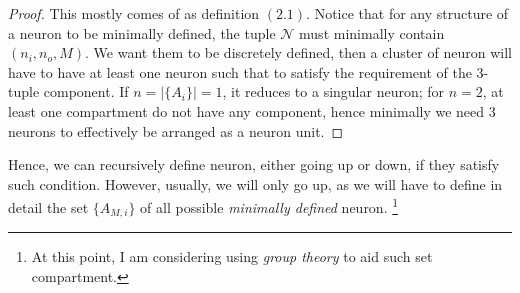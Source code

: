 \begin{proof}
    This mostly comes of as definition $(2.1)$. Notice that for any structure of a neuron to be minimally defined, the tuple $\mathcal{N}$ must minimally contain $(n_{i},n_{o},M)$. We want them to be discretely defined, then a cluster of neuron will have to have at least one neuron such that to satisfy the requirement of the 3-tuple component. If $n=\lvert \{ A_{i} \} \rvert=1$, it reduces to a singular neuron; for $n=2$, at least one compartment do not have any component, hence minimally we need 3 neurons to effectively be arranged as a neuron unit.
\end{proof}

Hence, we can recursively define neuron, either going up or down, if they satisfy such condition. However, usually, we will only go up, as we will have to define in detail the set $\{ A_{M,i} \}$ of all possible \textit{minimally defined} neuron. \footnote{At this point, I am considering using \textit{group theory} to aid such set compartment.}

